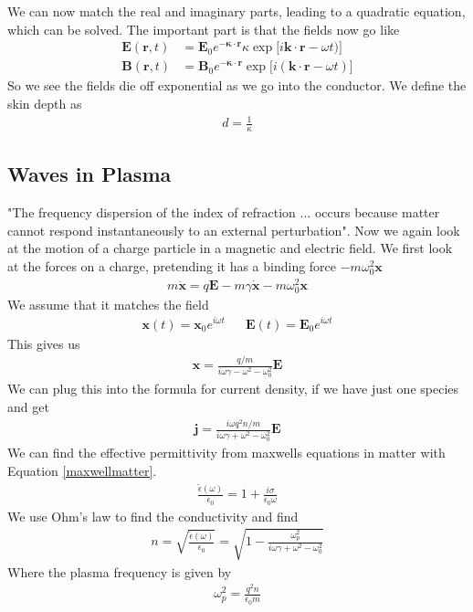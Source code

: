 We can now match the real and imaginary parts, leading to a quadratic equation, which can be solved. The important part is that the fields now go like
\begin{align}
\textbf{E}(\textbf{r},t) &= \textbf{E}_0e^{-\boldsymbol{\kappa}\cdot\textbf{r}}\kappa\exp\Big[i\textbf{k}\cdot\textbf{r}-\omega t)\Big]\\
\textbf{B}(\textbf{r},t) &= \textbf{B}_0e^{-\boldsymbol{\kappa}\cdot\textbf{r}}\exp\Big[i(\textbf{k}\cdot\textbf{r}-\omega t)\Big]
\end{align}
So we see the fields die off exponential as we go into the conductor. We define the skin depth as
\begin{align}
d = \frac{1}{\kappa}
\end{align}




\subsection{Waves in Plasma}


"The frequency dispersion of the index of refraction ... occurs because matter cannot respond instantaneously to an external perturbation".\cite{zangwill} Now we again look at the motion of a charge particle in a magnetic and electric field. We first look at the forces on a charge, pretending it has a binding force $-m\omega_0^2\textbf{x}$
\begin{align}
m\ddot{\textbf{x}} = q\textbf{E} -m\gamma\dot{\textbf{x}} - m\omega_0^2\textbf{x}
\end{align}
We assume that it matches the field
\begin{align}
\textbf{x}(t) = \textbf{x}_0e^{i\omega t} &&\textbf{E}(t) = \textbf{E}_0e^{i\omega t}
\end{align}
This gives us
\begin{align}
\textbf{x} = \frac{q/m}{i\omega\gamma - \omega^2-\omega_0^2}\textbf{E}
\end{align}
We can plug this into the formula for current density, if we have just one species and get
\begin{align}
\textbf{j} = \frac{i\omega q^2n/m}{i\omega\gamma + \omega^2-\omega_0^2}\textbf{E}
\end{align}
We can find the effective permittivity from maxwells equations in matter with Equation \ref{maxwellmatter}. 
\begin{align}
\frac{\tilde\epsilon(\omega)}{\epsilon_0} = 1 + \frac{i\sigma}{\epsilon_0 \omega}
\end{align}
We use Ohm's law to find the conductivity and find
\begin{align}
n = \sqrt{\frac{\tilde\epsilon(\omega)}{\epsilon_0}} = \sqrt{1- \frac{\omega_p^2}{i\omega\gamma + \omega^2-\omega_0^2}}
\end{align}
Where the plasma frequency is given by
\begin{align}
\boxed{\omega_p^2 = \frac{q^2n}{\epsilon_0 m}}
\end{align}




